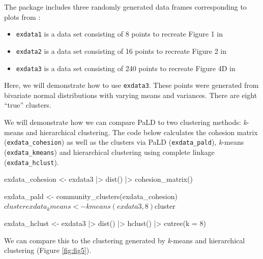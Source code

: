 The  package includes three randomly generated data frames
corresponding to plots from \citet{berenhaut2022social}:

\begin{itemize}
\tightlist
\item
  \texttt{exdata1} is a data set consisting of 8 points to recreate
  Figure 1 in \citet{berenhaut2022social}
\item
  \texttt{exdata2} is a data set consisting of 16 points to recreate
  Figure 2 in \citet{berenhaut2022social}
\item
  \texttt{exdata3} is a data set consisting of 240 points to recreate
  Figure 4D in \citet{berenhaut2022social}
\end{itemize}

Here, we will demonstrate how to use \texttt{exdata3}. These points were
generated from bivariate normal distributions with varying means and
variances. There are eight ``true'' clusters.

We will demonstrate how we can compare PaLD to two clustering methods:
\emph{k}-means and hierarchical clustering. The code below calculates
the cohesion matrix (\texttt{exdata\_cohesion}) as well as the clusters
via PaLD (\texttt{exdata\_pald}), \emph{k}-means
(\texttt{exdata\_kmeans}) and hierarchical clustering using complete
linkage (\texttt{exdata\_hclust}).

\begin{Schunk}
\begin{Sinput}
exdata_cohesion <- exdata3 |>
  dist() |>
  cohesion_matrix()

exdata_pald <- community_clusters(exdata_cohesion)$cluster

exdata_kmeans <- kmeans(exdata3, 8)$cluster

exdata_hclust <- exdata3 |>
  dist() |>
  hclust() |>
  cutree(k = 8) 
\end{Sinput}
\end{Schunk}

We can compare this to the clustering generated by \emph{k}-means and
hierarchical clustering (Figure \ref{fig:fig5}).

